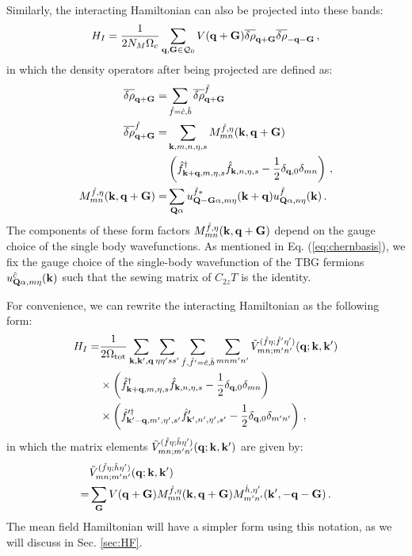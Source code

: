 \documentclass[prb,aps,nofootinbib,amssymb,twocolumn,superscriptaddress,10pt]{revtex4-2}
\begin{document}
Similarly, the interacting Hamiltonian can also be projected into these bands:
\begin{equation}\label{eq:proj-HI}
	H_I = \frac{1}{2N_M\Omega_{c}}\sum_{\mathbf{q},\mathbf{G}\in\mathcal{Q}_0}V(\mathbf{q} + \mathbf{G})\overline{\delta\rho}_{\mathbf{q} + \mathbf{G}}\overline{\delta\rho}_{-\mathbf{q} - \mathbf{G}}\,,
\end{equation}
in which the density operators after being projected are defined as:
\begin{align}
	\overline{\delta\rho}_{\mathbf{q} + \mathbf{G}} =& \sum_{\hat{f} = \hat{c}, \hat{b}}\overline{\delta\rho}^{\hat{f}}_{\mathbf{q} + \mathbf{G}}\\
	\overline{\delta\rho}^{\hat{f}}_{\mathbf{q} + \mathbf{G}} =& \sum_{\mathbf{k},m,n,\eta,s}M^{\hat{f}, \eta}_{mn}(\mathbf{k}, \mathbf{q} + \mathbf{G})\nonumber\\
	&\left(\hat{f}^\dagger_{\mathbf{k} + \mathbf{q}, m, \eta, s}\hat{f}_{\mathbf{k}, n, \eta, s} - \frac12 \delta_{\mathbf{q}, 0}\delta_{mn} \right)\,,\\
	M^{\hat{f},\eta}_{mn}(\mathbf{k}, \mathbf{q} + \mathbf{G}) =& \sum_{\mathbf{Q}\alpha}u^{\hat{f}*}_{\mathbf{Q}-\mathbf{G}\alpha, m\eta}(\mathbf{k} + \mathbf{q})u^{\hat{f}}_{\mathbf{Q}\alpha, n\eta}(\mathbf{k})\,.
\end{align}
The components of these form factors $M_{mn}^{\hat{f},\eta}(\mathbf{k}, \mathbf{q} + \mathbf{G})$ depend on the gauge choice of the single body wavefunctions. 
As mentioned in Eq. (\ref{eq:chernbasis}), we fix the gauge choice of the single-body wavefunction of the TBG fermions $u^{\hat{c}}_{\mathbf{Q}\alpha,m\eta}(\mathbf{k})$ such that the sewing matrix of $C_{2z}T$ is the identity.

For convenience, we can rewrite the interacting Hamiltonian as the following form:
\begin{align}
	H_I =& \frac{1}{2\Omega_{\rm tot}} \sum_{\mathbf{k},\mathbf{k}',\mathbf{q}}\sum_{\eta\eta'ss'}\sum_{\hat{f},\hat{f}'=\hat{c},\hat{b}}\sum_{mnm'n'}\tilde{V}^{(\hat{f}\eta;\hat{f}'\eta')}_{mn;m'n'}(\mathbf{q};\mathbf{k},\mathbf{k}')\nonumber\\
	& \times \left(\hat{f}^\dagger_{\mathbf{k} + \mathbf{q}, m,\eta, s}\hat{f}_{\mathbf{k}, n,\eta, s} - \frac{1}{2}\delta_{\mathbf{q}, 0}\delta_{mn}\right)\nonumber\\
	& \times\left(\hat{f}'^\dagger_{\mathbf{k}'-\mathbf{q}, m',\eta', s'}\hat{f}'_{\mathbf{k}',n',\eta', s'} - \frac12 \delta_{\mathbf{q},0}\delta_{m'n'} \right)\,,
\end{align}
in which the matrix elements $\tilde{V}^{(\hat{f}\eta;\hat{h}\eta')}_{mn;m'n'}(\mathbf{q}; \mathbf{k}, \mathbf{k}')$ are given by:
\begin{align}
	&\tilde{V}^{(\hat{f}\eta;\hat{h}\eta')}_{mn;m'n'}(\mathbf{q}; \mathbf{k}, \mathbf{k}') \nonumber\\
	=& \sum_{\mathbf{G}}V(\mathbf{q} + \mathbf{G})M^{\hat{f},\eta}_{mn}(\mathbf{k}, \mathbf{q} + \mathbf{G})M^{\hat{h},\eta'}_{m'n'}(\mathbf{k}', -\mathbf{q} - \mathbf{G})\,.
\end{align}
The mean field Hamiltonian will have a simpler form using this notation, as we will discuss in Sec. \ref{sec:HF}.
\end{document}
